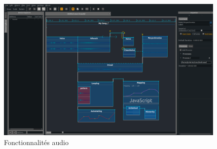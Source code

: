 \documentclass{beamer}
\begin{document}
\begin{frame}
\begin{columns}
\begin{column}{0.5\textwidth}
\begin{figure}
	\end{figure}		
\end{column}
\end{columns}
\end{frame}

\begin{frame}
	\begin{figure}
		\includegraphics[width=\textwidth]{images/audio.png}
		\caption{Fonctionnalités audio}
	\end{figure}
\end{frame}
\end{document}
